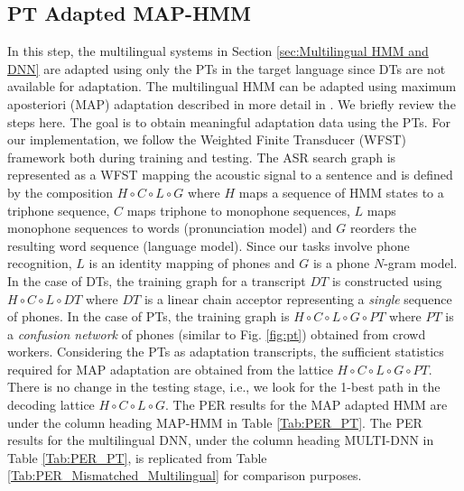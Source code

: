 \documentclass[a4paper]{article}
\begin{document}
\subsection{PT Adapted MAP-HMM} \vspace{-1mm}
\label{sec:PT Adapted MAP-HMM}
In this step, the multilingual systems in Section \ref{sec:Multilingual HMM and DNN} are adapted using only the PTs in the target language since DTs are not available for adaptation. The multilingual HMM can be adapted using maximum aposteriori (MAP) adaptation described in more detail in \cite{Liu-PTAdaptedGMM}. We briefly review the steps here. The goal is to obtain meaningful adaptation data using the PTs. For our implementation, we follow the Weighted Finite Transducer (WFST)~\cite{Mohri-WFST} framework both during training and testing. The ASR search graph is represented as a WFST mapping the acoustic signal to a sentence and is defined by the composition $H \circ C \circ L \circ G$ where $H$ maps a sequence of HMM states to a triphone sequence, $C$ maps triphone to monophone sequences, $L$ maps monophone sequences to words (pronunciation model) and $G$ reorders the resulting word sequence (language model). Since our tasks involve phone recognition, $L$ is an identity mapping of phones and $G$ is a phone $N$-gram model. In the case of DTs, the training graph for a transcript $DT$ is constructed using $H \circ C \circ L \circ DT$ where $DT$ is a linear chain acceptor representing a \emph{single} sequence of phones. In the case of PTs, the training graph is $H \circ C \circ L \circ G \circ PT$ where $PT$ is a \emph{confusion network} of phones (similar to Fig. \ref{fig:pt}) obtained from crowd workers. Considering the PTs as adaptation transcripts, the sufficient statistics required for MAP adaptation are obtained from the lattice  $H \circ C \circ L \circ G \circ PT$. There is no change in the testing stage, i.e., we look for the 1-best path in the decoding lattice $H \circ C \circ L \circ G$. The PER results for the MAP adapted HMM are under the column heading MAP-HMM in Table \ref{Tab:PER_PT}. The PER results for the multilingual DNN, under the column heading MULTI-DNN in Table \ref{Tab:PER_PT}, is replicated from Table \ref{Tab:PER_Mismatched_Multilingual} for comparison purposes.
\end{document}
